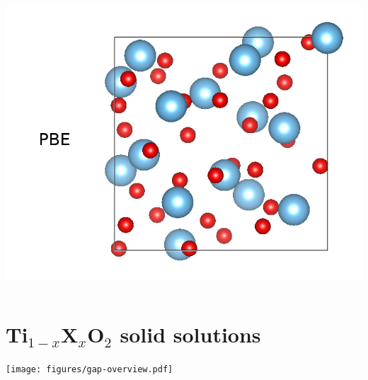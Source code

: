 \documentclass{beamer}
\begin{document}
\begin{frame}
\begin{columns}
\begin{column}{0.5\linewidth}
		\newline
		\includegraphics[width=0.9\linewidth]{figures/PBESOL.png}
	\end{column}
	\end{columns}
\end{frame}

\section{Ti$_{1-x}$X$_x$O$_2$ solid solutions}
\begin{frame}
	\texttt{[image: figures/gap-overview.pdf]}
\end{frame}
\end{document}
